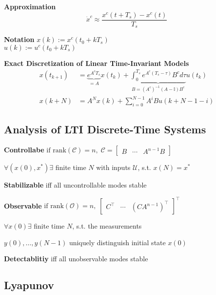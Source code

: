 \begin{minipage}[c]{0.5\linewidth}
	\textbf{Approximation}\\
	\[
		\dot{x}^c \approx \frac{x^c(t + T_s)-x^c(t)}{T_s}
	\]
\end{minipage}
\begin{minipage}[c]{0.45\linewidth}
	\center\textbf{Notation}
	$x(k):= x^c(t_0+kT_s)$\\
	$u(k):= u^c(t_0+kT_s)$\\
\end{minipage}
\textbf{Exact Discretization of Linear Time-Invariant Models}
\[\begin{aligned}
		x(t_{k+1}) & =
		\underbrace{e^{A^c T_s}}
		_{=A} x(t_k) +
		\underbrace{\textstyle\int_{0}^{T_s}
			e^{A^c(T_s - \tau)}B^c d\tau}
		_{B=(A^c)^{-1}(A-\mathbb{I})B^c} u(t_k)
		\\
		x(k+N)     & = A^N x(k) + \textstyle\sum_{i=0}^{N-1}
		A^i B u(k+N-1-i)
	\end{aligned} \]

\subsection{Analysis of LTI Discrete-Time Systems}



\textbf{Controllabe}
$
	\text{if rank}(\mathcal{C}) = n
	,\;
	\mathcal{C} =
	\begin{bmatrix}
		B & \cdots & A^{n-1} B
	\end{bmatrix}
$

$\forall(x(0),x^*)\exists$ finite time $N$
with inputs $\mathcal{U}$, s.t. $x(N)=x^*$

\textbf{Stabilizable} iff all uncontrollable modes stable

\textbf{Observable}
$
	\text{if rank}(\mathcal{O}) = n
	,\;
	\begin{bmatrix}
		C^\top & \cdots & (CA^{n-1})^\top
	\end{bmatrix}^\top
$

$\forall x(0)\exists$ finite time $N$, s.t. the measurements

$y(0), \dots, y(N-1)$
uniquely distinguish initial state $x(0)$

\textbf{Detectablitiy} iff all unobservable modes stable

\subsection{Lyapunov}

